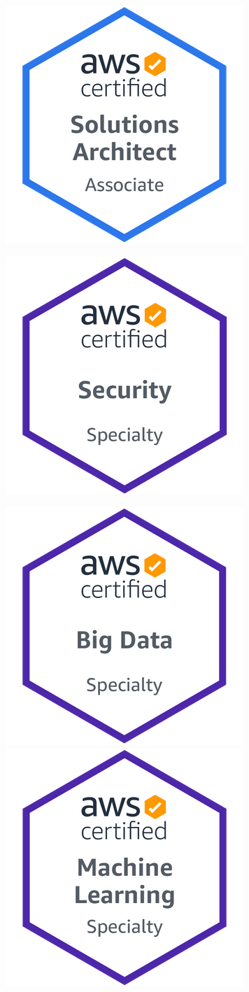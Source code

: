 \documentclass[]{cv-a4}
\begin{document}
\begin{multicols}{3}
\begin{center}
    \includegraphics[width=0.45\linewidth]{images/AWS-SolArchitect-Associate-2020.png}
  \end{center}
  \vfill\null

  \columnbreak

  \begin{center}
    \includegraphics[width=0.45\linewidth]{images/AWS-Security-Specialty-2020.png}

    \includegraphics[width=0.45\linewidth]{images/AWS-BigData-Specialty-2020.png}
    \includegraphics[width=0.45\linewidth]{images/AWS-MachineLearning-Specialty-2020.png}
  \end{center}
  \vfill\null
\end{multicols}
\end{document}
